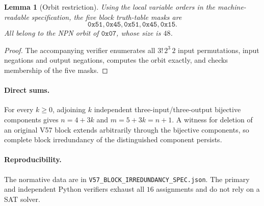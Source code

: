 \documentclass[11pt]{article}
\newtheorem{lemma}{Lemma}
\begin{document}
\begin{lemma}[Orbit restriction]
Using the local variable orders in the machine-readable specification, the five block
truth-table masks are
\[
\mathtt{0x51},\mathtt{0x45},\mathtt{0x51},\mathtt{0x45},\mathtt{0x15}.
\]
All belong to the NPN orbit of $\mathtt{0x07}$, whose size is $48$.
\end{lemma}

\begin{proof}
The accompanying verifier enumerates all $3!\,2^3\,2$ input permutations, input
negations and output negations, computes the orbit exactly, and checks membership of
the five masks.
\end{proof}

\paragraph{Direct sums.}
For every $k\ge 0$, adjoining $k$ independent three-input/three-output bijective
components gives $n=4+3k$ and $m=5+3k=n+1$. A witness for deletion of an original
V57 block extends arbitrarily through the bijective components, so complete block
irredundancy of the distinguished component persists.

\paragraph{Reproducibility.}
The normative data are in \texttt{V57\_BLOCK\_IRREDUNDANCY\_SPEC.json}.
The primary and independent Python verifiers exhaust all $16$ assignments and do not
rely on a SAT solver.
\end{document}
